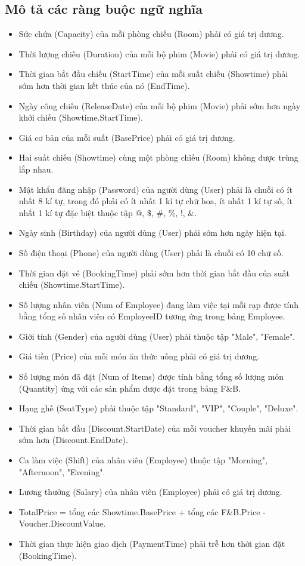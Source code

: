 \documentclass[a4paper]{article}
\begin{document}
\subsection{Mô tả các ràng buộc ngữ nghĩa}
\begin{itemize}
\item Sức chứa (Capacity) của mỗi phòng chiếu (Room) phải có giá trị dương.
	\item Thời lượng chiếu (Duration) của mỗi bộ phim (Movie) phải có giá trị dương.
	\item Thời gian bắt đầu chiếu (StartTime) của mỗi suất chiếu (Showtime) phải sớm hơn thời gian kết thúc của nó (EndTime).
	\item Ngày công chiếu (ReleaseDate) của mỗi bộ phim (Movie) phải sớm hơn ngày khởi chiếu (Showtime.StartTime).
	\item Giá cơ bản của mỗi suất (BasePrice) phải có giá trị dương.
	\item Hai suất chiếu (Showtime) cùng một phòng chiếu (Room) không được trùng lắp nhau.
	\item Mật khẩu đăng nhập (Password) của người dùng (User) phải là chuỗi có ít nhất 8 kí tự, trong đó phải có ít nhất 1 kí tự chữ hoa, ít nhất 1 kí tự số, ít nhất 1 kí tự đặc biệt thuộc tập {$@$, $\mathdollar$, $\#$, $\%$, !, $\&$}.
	\item Ngày sinh (Birthday) của người dùng (User) phải sớm hơn ngày hiện tại.
	\item Số điện thoại (Phone) của người dùng (User) phải là chuỗi có 10 chữ số.
	\item Thời gian đặt vé (BookingTime) phải sớm hơn thời gian bắt đầu của suất chiếu (Showtime.StartTime).
	\item Số lượng nhân viên (Num of Employee) đang làm việc tại mỗi rạp được tính bằng tổng số nhân viên có EmployeeID tương ứng trong bảng Employee.
	\item Giới tính (Gender) của người dùng (User) phải thuộc tập {"Male", "Female"}.
	\item Giá tiền (Price) của mỗi món ăn thức uống phải có giá trị dương.
	\item Số lượng món đã đặt (Num of Items) được tính bằng tổng số lượng món (Quantity) ứng với các sản phẩm được đặt trong bảng F\&B.
	\item Hạng ghế (SeatType) phải thuộc tập {"Standard", "VIP", "Couple", "Deluxe"}.
	\item Thời gian bắt đầu (Discount.StartDate) của mỗi voucher khuyến mãi phải sớm hơn (Discount.EndDate).
	\item Ca làm việc (Shift) của nhân viên (Employee) thuộc tập {"Morning", "Afternoon", "Evening"}.
	\item Lương thưởng (Salary) của nhân viên (Employee) phải có giá trị dương.
	\item TotalPrice = tổng các Showtime.BasePrice + tổng các F\&B.Price - Voucher.DiscountValue.
	\item Thời gian thực hiện giao dịch (PaymentTime) phải trễ hơn thời gian đặt (BookingTime).
\end{itemize}
\pagebreak
\end{document}
